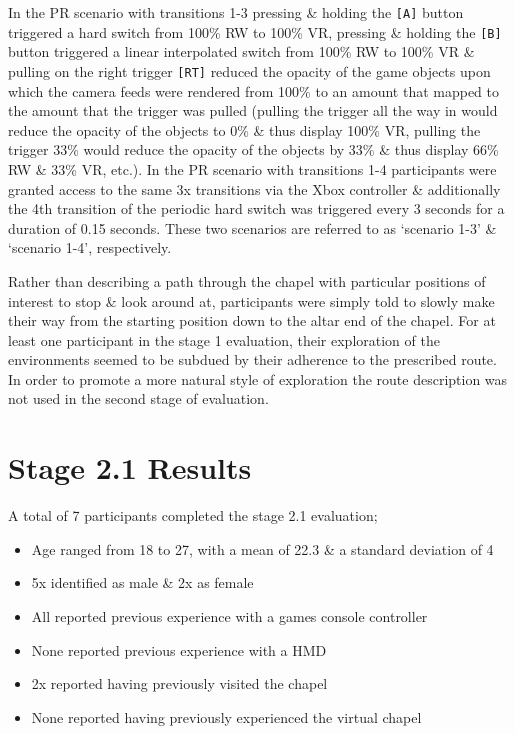 In the PR scenario with transitions 1-3 pressing \& holding the \texttt{[A]} button triggered a hard switch from 100\% RW to 100\% VR, pressing \& holding the \texttt{[B]} button triggered a linear interpolated switch from 100\% RW to 100\% VR \& pulling on the right trigger \texttt{[RT]} reduced the opacity of the game objects upon which the camera feeds were rendered from 100\% to an amount that mapped to the amount that the trigger was pulled (pulling the trigger all the way in would reduce the opacity of the objects to 0\% \& thus display 100\% VR, pulling the trigger 33\% would reduce the opacity of the objects by 33\% \& thus display 66\% RW \& 33\% VR, etc.). In the PR scenario with transitions 1-4 participants were granted access to the same 3x transitions via the Xbox controller \& additionally the 4th transition of the periodic hard switch was triggered every 3 seconds for a duration of 0.15 seconds. These two scenarios are referred to as `scenario 1-3' \& `scenario 1-4', respectively.

Rather than describing a path through the chapel with particular positions of interest to stop \& look around at, participants were simply told to slowly make their way from the starting position down to the altar end of the chapel. For at least one participant in the stage 1 evaluation, their exploration of the environments seemed to be subdued by their adherence to the prescribed route. In order to promote a more natural style of exploration the route description was not used in the second stage of evaluation.


\section{Stage 2.1 Results}

A total of 7 participants completed the stage 2.1 evaluation;
\begin{itemize}
	\item Age ranged from 18 to 27, with a mean of 22.3 \& a standard deviation of 4
	\item 5x identified as male \& 2x as female
	\item All reported previous experience with a games console controller
	\item None reported previous experience with a HMD
	\item 2x reported having previously visited the chapel
	\item None reported having previously experienced the virtual chapel
\end{itemize}

